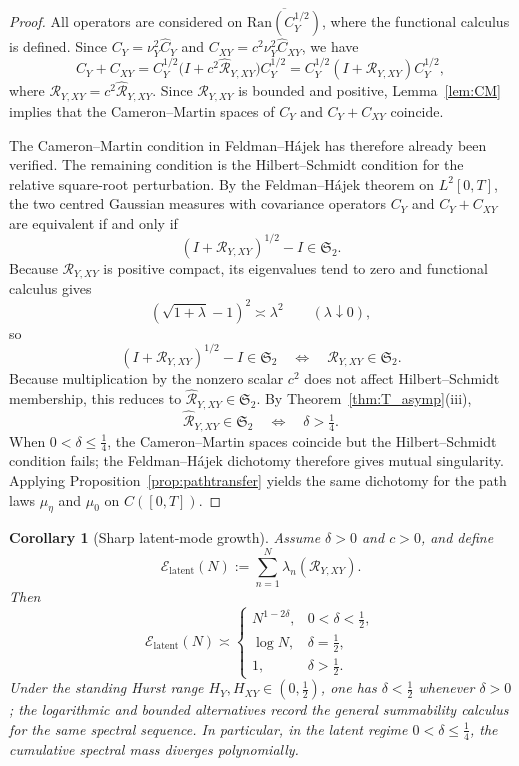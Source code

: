 \documentclass[11pt,a4paper]{amsart}
\theoremstyle{plain}
\newtheorem{corollary}[theorem]{Corollary}
\theoremstyle{definition}
\theoremstyle{remark}
\begin{document}
\begin{proof}
All operators are considered on $\overline{\mathrm{Ran}(C_Y^{1/2})}$, where the functional calculus is defined. Since $C_Y=\nu_Y^2\widehat C_Y$ and $C_{XY}=c^2\nu_Y^2\widehat C_{XY}$, we have
\[
C_Y+C_{XY}
=
C_Y^{1/2}\bigl(I+c^2\widehat{\mathcal R}_{Y,XY}\bigr)C_Y^{1/2}
=
C_Y^{1/2}(I+\mathcal R_{Y,XY})C_Y^{1/2},
\]
where \(\mathcal R_{Y,XY}=c^2\widehat{\mathcal R}_{Y,XY}\). Since \(\mathcal R_{Y,XY}\) is bounded and positive, Lemma~\ref{lem:CM} implies that the Cameron--Martin spaces of \(C_Y\) and \(C_Y+C_{XY}\) coincide.

The Cameron--Martin condition in Feldman--H\'ajek has therefore already been verified. The remaining condition is the Hilbert--Schmidt condition for the relative square-root perturbation. By the Feldman--H\'ajek theorem on $L^2[0,T]$, the two centred Gaussian measures with covariance operators $C_Y$ and $C_Y+C_{XY}$ are equivalent if and only if
\[
(I+\mathcal R_{Y,XY})^{1/2}-I\in\mathfrak S_2.
\]
Because \(\mathcal R_{Y,XY}\) is positive compact, its eigenvalues tend to zero and functional calculus gives
\[
(\sqrt{1+\lambda}-1)^2\asymp \lambda^2
\qquad (\lambda\downarrow 0),
\]
so
\[
(I+\mathcal R_{Y,XY})^{1/2}-I\in\mathfrak S_2
\quad\Longleftrightarrow\quad
\mathcal R_{Y,XY}\in\mathfrak S_2.
\]
Because multiplication by the nonzero scalar $c^2$ does not affect Hilbert--Schmidt membership, this reduces to \(\widehat{\mathcal R}_{Y,XY}\in\mathfrak S_2\). By Theorem~\ref{thm:T_asymp}(iii),
\[
\widehat{\mathcal R}_{Y,XY}\in\mathfrak S_2
\quad\Longleftrightarrow\quad
\delta>\tfrac14.
\]
When $0<\delta\le\tfrac14$, the Cameron--Martin spaces coincide but the Hilbert--Schmidt condition
fails; the Feldman--H\'ajek dichotomy therefore gives mutual singularity. Applying
Proposition~\ref{prop:pathtransfer} yields the same dichotomy for the path laws $\mu_\eta$ and
$\mu_0$ on $C([0,T])$.
\end{proof}

\begin{corollary}[Sharp latent-mode growth]\label{cor:latentgrowth}
Assume $\delta>0$ and $c>0$, and define
\[
\mathcal E_{\mathrm{latent}}(N):=\sum_{n=1}^N \lambda_n(\mathcal R_{Y,XY}).
\]
Then
\[
\mathcal E_{\mathrm{latent}}(N)\asymp
\begin{cases}
N^{1-2\delta}, & 0<\delta<\frac12,\\[4pt]
\log N, & \delta=\frac12,\\[4pt]
1, & \delta>\frac12.
\end{cases}
\]
Under the standing Hurst range $H_Y,H_{XY}\in(0,\tfrac12)$, one has $\delta<\tfrac12$ whenever $\delta>0$; the logarithmic and bounded alternatives record the general summability calculus for the same spectral sequence. In particular, in the latent regime $0<\delta\le\frac14$, the cumulative spectral mass diverges polynomially.
\end{corollary}
\end{document}
